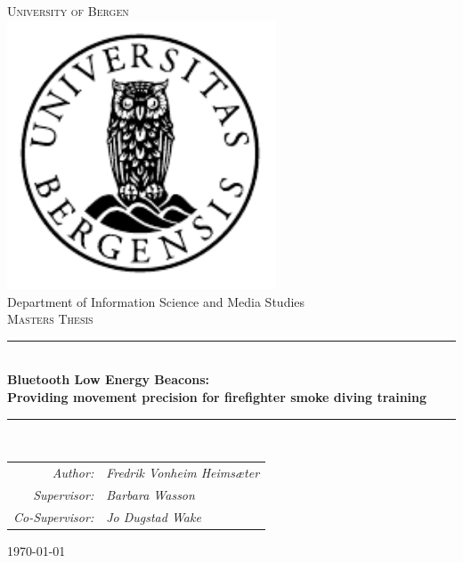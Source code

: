 \documentclass[../Main/thesis.tex]{subfiles}
\begin{document}

\newcommand{\HRule}{\rule{\linewidth}{0.5mm}}

\begin{titlepage}
\begin{center}
\textsc{\Huge University of Bergen}\\[0.4cm]
\includegraphics[width=8cm]{../fig/uib} \\[0.5cm]

\large Department of Information Science and Media Studies\\[0.7cm]
\textsc{\huge Masters Thesis}\\[0.4cm]
\HRule \\[0.4cm]
{ \huge \bfseries Bluetooth Low Energy Beacons: \\Providing movement precision for firefighter smoke diving training}\\[0.5cm]
\HRule \\[1.0cm]

\begin{tabular}{rl}
\textit{Author:}        & \textit{Fredrik Vonheim Heimsæter} \\
\textit{Supervisor:}    & \textit{Barbara Wasson}            \\
\textit{Co-Supervisor:} & \textit{Jo Dugstad Wake}
\end{tabular}

\end{center}
\vfill
\begin{center}
{\large \today}
\end{center}
\end{titlepage}
\end{document}
